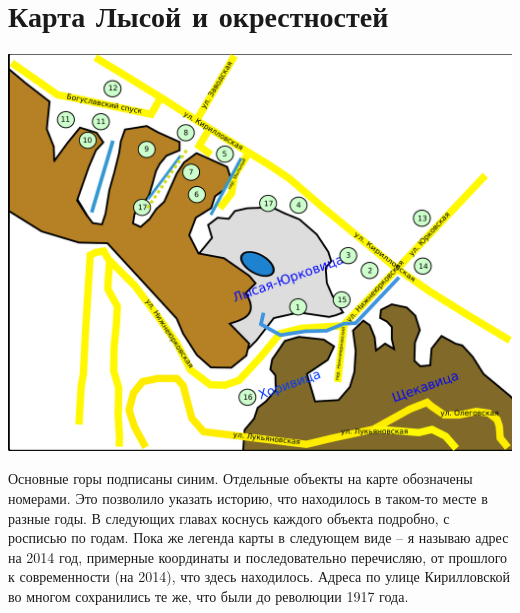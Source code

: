 \chapter{Карта Лысой и окрестностей}

\begin{center}
\includegraphics[width=\linewidth]{chast-kirvys/karta/y-main.pdf}
\end{center}

Основные горы подписаны синим. Отдельные объекты на карте обозначены номерами. Это позволило указать историю, что находилось в таком-то месте в разные годы. В следующих главах коснусь каждого объекта подробно, с росписью по годам. Пока же легенда карты в следующем виде – я называю адрес на 2014 год, примерные координаты и последовательно перечисляю, от прошлого к современности (на 2014), что здесь находилось. Адреса по улице Кирилловской во многом сохранились те же, что были до революции 1917 года.

